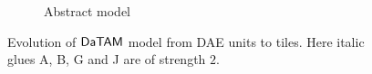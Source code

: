 \begin{figure}[H]
\begin{center}
\begin{subfigure}[b]{0.190\textwidth}
		\caption{Abstract model}
		\label{fig:abstract_model}
	\end{subfigure}
	\caption{Evolution of $\mathsf{DaTAM}$ model from DAE units to tiles. Here italic glues {\sf A}, {\sf B}, {\sf G} and {\sf J} are of strength $2$.} %
	\label{fig:evolution}
\end{center}
\end{figure}
